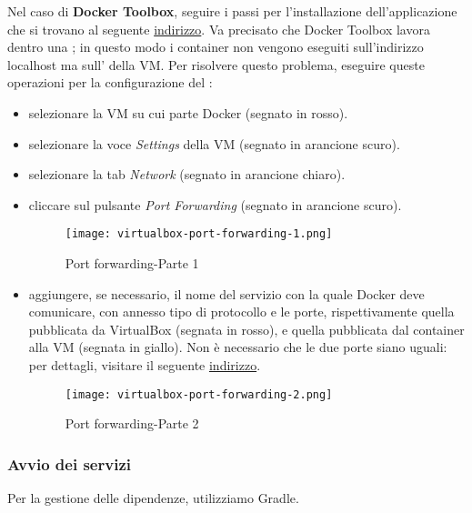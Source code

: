 \documentclass[../manuale-manutentore.tex]{subfiles}
\begin{document}
Nel caso di \textbf{Docker Toolbox}, seguire i passi per l'installazione dell'applicazione che si trovano al seguente \href{https://docs.docker.com/toolbox/toolbox_install_windows/}{indirizzo}.
Va precisato che Docker Toolbox lavora dentro una ; in questo modo i container non vengono eseguiti sull'indirizzo localhost ma sull' della VM\@.
Per risolvere questo problema, eseguire queste operazioni per la configurazione del :
\begin{itemize}
  \item selezionare la VM su cui parte Docker (segnato in rosso).
  \item selezionare la voce \textit{Settings} della VM (segnato in arancione scuro).
  \item selezionare la tab \textit{Network} (segnato in arancione chiaro).
  \item cliccare sul pulsante \textit{Port Forwarding} (segnato in arancione scuro).

  \begin{figure}[H]
    \centering
    \texttt{[image: virtualbox-port-forwarding-1.png]}
    \caption{Port forwarding-Parte 1}%
    \label{fig:port_forwarding_parte_1}
  \end{figure}

  \item aggiungere, se necessario, il nome del servizio con la quale Docker deve comunicare, con annesso tipo di protocollo e le porte, rispettivamente quella pubblicata da VirtualBox (segnata in rosso), e quella pubblicata dal container alla VM (segnata in giallo). Non è necessario che le due porte siano uguali: per dettagli, visitare il seguente \href{https://docs.docker.com/config/containers/container-networking/#published-ports#published-ports}{indirizzo}.

  \begin{figure}[H]
    \centering
    \texttt{[image: virtualbox-port-forwarding-2.png]}
    \caption{Port forwarding-Parte 2}%
    \label{fig:port_forwarding_parte_2}
  \end{figure}
\end{itemize}
\newpage

\subsubsection{Avvio dei servizi}%
\label{subs:avvio_dei_servizi}

Per la gestione delle dipendenze, utilizziamo Gradle.
\end{document}
